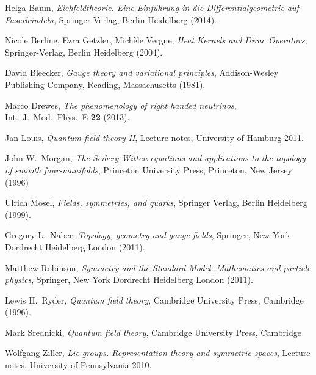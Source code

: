 \documentclass[12pt]{amsart}
\theoremstyle{definition}
\theoremstyle{remark}
\numberwithin{equation}{section}
\begin{document}
\begin{thebibliography}{999}

 Helga Baum, {\sl Eichfeldtheorie. Eine Einf\"uhrung in die Differentialgeometrie auf Faserb\"undeln}, Springer Verlag, Berlin Heidelberg (2014).

 Nicole Berline, Ezra Getzler, Mich\`ele Vergne, {\sl Heat Kernels and Dirac Operators}, Springer-Verlag, Berlin Heidelberg (2004).

 David Bleecker, {\sl Gauge theory and variational principles}, Addison-Wesley Publishing Company, Reading, Massachusetts (1981).

 Marco Drewes, {\em The phenomenology of right handed neutrinos}, Int.~J.~Mod.~Phys.~E {\bf 22} (2013).

 Jan Louis, {\em Quantum field theory II}, Lecture notes, University of Hamburg 2011.

 John W.~Morgan, {\sl The Seiberg-Witten equations and applications to the topology of smooth four-manifolds}, Princeton University Press, Princeton, New Jersey (1996)

 Ulrich Mosel, {\sl Fields, symmetries, and quarks}, Springer Verlag, Berlin Heidelberg (1999).

 Gregory L.~Naber, {\sl Topology, geometry and gauge fields}, Springer, New York Dordrecht Heidelberg London (2011).

 Matthew Robinson, {\sl Symmetry and the Standard Model. Mathematics and particle physics}, Springer, New York Dordrecht Heidelberg London (2011).

Lewis H.~Ryder, {\sl Quantum field theory}, Cambridge University Press, Cambridge (1996).

 Mark Srednicki, {\sl Quantum field theory}, Cambridge University Press, Cambridge

 Wolfgang Ziller, {\em Lie groups. Representation theory and symmetric spaces}, Lecture notes, University of Pennsylvania 2010.



\end{thebibliography}
\bigskip
\bigskip
\end{document}
